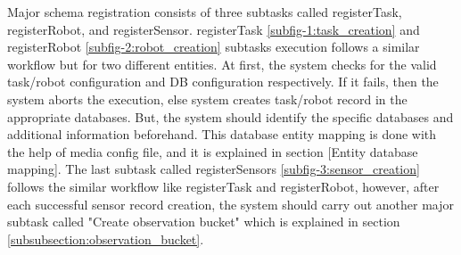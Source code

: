 	Major schema registration consists of three subtasks called registerTask, registerRobot, and registerSensor. registerTask \ref{subfig-1:task_creation} and registerRobot \ref{subfig-2:robot_creation} subtasks execution follows a similar workflow but for two different entities. At first, the system checks for the valid task/robot configuration and DB configuration respectively. If it fails, then the system aborts the execution, else system creates task/robot record in the appropriate databases. But, the system should identify the specific databases and additional information beforehand. This database entity mapping is done with the help of media config file, and it is explained in section [Entity database mapping].
	The last subtask called registerSensors \ref{subfig-3:sensor_creation} follows the similar workflow like registerTask and registerRobot, however, after each successful sensor record creation, the system should carry out another major subtask called "Create observation bucket" which is explained in section \ref{subsubsection:observation_bucket}.
	
